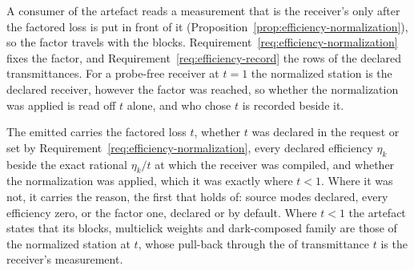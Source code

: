 
A consumer of the artefact reads a measurement that is the receiver's only
after the factored loss is put in front of it
(Proposition~\ref{prop:efficiency-normalization}), so the factor travels with
the blocks. Requirement~\ref{req:efficiency-normalization} fixes the factor,
and Requirement~\ref{req:efficiency-record} the rows of the declared
transmittances. For a probe-free receiver at $t=1$ the normalized station is
the declared receiver,
however the factor was reached, so whether the normalization was applied is
read off $t$ alone, and who chose $t$ is recorded beside it.

\begin{requirement}\label{req:normalization-record}
The emitted  carries the factored loss $t$, whether
$t$ was declared in the request or set by
Requirement~\ref{req:efficiency-normalization}, every declared efficiency
$\eta_k$ beside the exact rational $\eta_k/t$ at which the receiver was
compiled, and whether the normalization was applied, which it was exactly
where $t<1$. Where it was not, it carries the reason, the first that holds of:
source modes declared, every efficiency zero, or the factor one, declared or
by default. Where $t<1$ the artefact states that its blocks, multiclick
weights and dark-composed family are those of the normalized station at $t$,
whose pull-back through the  of transmittance $t$ is the
receiver's measurement.
\end{requirement}
